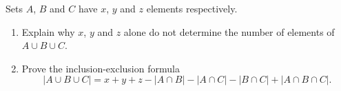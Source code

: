 Sets $A$, $B$ and $C$ have $x$, $y$ and $z$ elements respectively.
\begin{enumerate}
\item[(a)] Explain why $x$, $y$ and $z$ alone do not determine the number of elements of $A\cup B\cup C$.
\item[(b)] Prove the inclusion-exclusion formula
\[|A\cup B\cup C|=x+y+z-|A\cap B|-|A\cap C|-|B\cap C|+|A\cap B\cap C| .\]
\end{enumerate}
